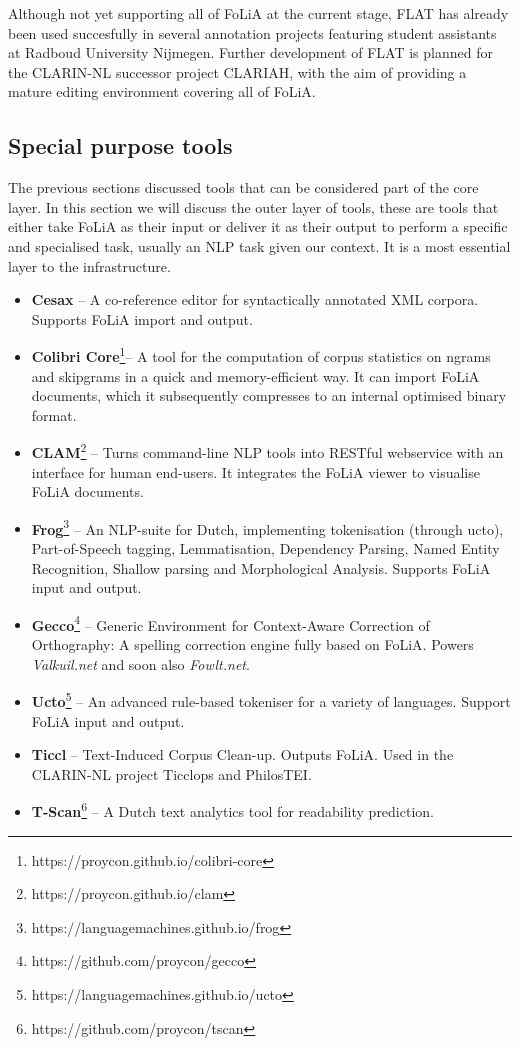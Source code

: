 \documentclass[a4paper,11pt]{article}
\begin{document}
Although not yet supporting all of FoLiA at the current stage, FLAT has already
been used succesfully in several annotation projects featuring student
assistants at Radboud University Nijmegen. Further development of FLAT is
planned for the CLARIN-NL successor project CLARIAH, with the aim of providing
a mature editing environment covering all of FoLiA.

\subsection{Special purpose tools}

The previous sections discussed tools that can be considered part of the
core layer. In this section we will discuss the outer layer of tools, these are
tools that either take FoLiA as their input or deliver it as their output to
perform a specific and specialised task, usually an NLP task given our context.
It is a most essential layer to the infrastructure.

\begin{itemize}
\item \textbf{Cesax} -- A co-reference editor for syntactically annotated XML corpora.
    Supports FoLiA import and output.\cite{CESAX} 
\item \textbf{Colibri Core}\footnote{https://proycon.github.io/colibri-core}-- A tool for the computation
    of corpus statistics on ngrams and skipgrams in a quick and
    memory-efficient way. It can import FoLiA documents, which it subsequently
    compresses to an internal optimised binary format.
\item \textbf{CLAM}\footnote{https://proycon.github.io/clam} -- Turns command-line NLP tools into RESTful webservice with an
    interface for human end-users. It integrates the FoLiA viewer to visualise
    FoLiA documents.\cite{CLAM}
\item \textbf{Frog}\footnote{https://languagemachines.github.io/frog} -- An NLP-suite for Dutch, implementing tokenisation (through
    ucto), Part-of-Speech tagging, Lemmatisation, Dependency Parsing, Named
    Entity Recognition, Shallow parsing and Morphological Analysis. Supports
    FoLiA input and output.
\item \textbf{Gecco}\footnote{https://github.com/proycon/gecco}  -- Generic Environment for Context-Aware Correction
    of Orthography: A spelling correction engine fully based on FoLiA. Powers
    \emph{Valkuil.net} and soon also \emph{Fowlt.net}.
\item \textbf{Ucto}\footnote{https://languagemachines.github.io/ucto} -- An advanced rule-based tokeniser for a variety of
    languages. Support FoLiA
    input and output.\cite{UCTO}
\item \textbf{Ticcl} -- Text-Induced Corpus Clean-up. Outputs FoLiA. Used in the
    CLARIN-NL project Ticclops and PhilosTEI.\cite{TICCL}
\item \textbf{T-Scan}\footnote{https://github.com/proycon/tscan} -- A Dutch text analytics tool for readability
    prediction.\cite{TSCAN}
\end{itemize}
\end{document}
